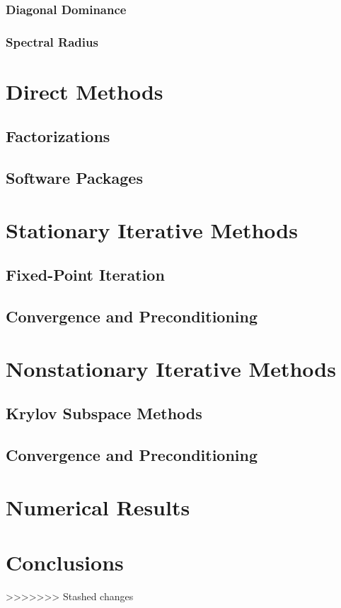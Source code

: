 \documentclass[10pt]{article}
\begin{document}
\begin{multicols}{2}
\subsubsection{Diagonal Dominance}
\subsubsection{Spectral Radius}

\section{Direct Methods}
\subsection{Factorizations}
\subsection{Software Packages}

\section{Stationary Iterative Methods}
\subsection{Fixed-Point Iteration}
\subsection{Convergence and Preconditioning}

\section{Nonstationary Iterative Methods}
\subsection{Krylov Subspace Methods}
\subsection{Convergence and Preconditioning}

\section{Numerical Results}

\section{Conclusions}

\nocite{*}


\end{multicols}
>>>>>>> Stashed changes
\end{document}
